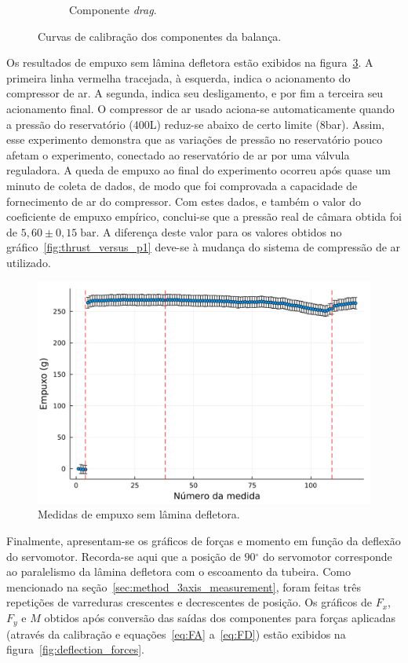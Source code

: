 \begin{figure}[htbp]
\begin{subfigure}{\textwidth}
        \caption{Componente \textit{drag}.}\label{fig:calibration_FD}
    \end{subfigure}
    \caption{Curvas de calibração dos componentes da balança.}\label{fig:calibration_curves}
\end{figure}

Os resultados de empuxo sem lâmina defletora estão exibidos na figura~\ref{fig:thrust_no_deflector}. A primeira linha vermelha tracejada, à esquerda, indica o acionamento do compressor de ar. A segunda, indica seu desligamento, e por fim a terceira seu acionamento final. O compressor de ar usado aciona-se automaticamente quando a pressão do reservatório (400L) reduz-se abaixo de certo limite (8bar). Assim, esse experimento demonstra que as variações de pressão no reservatório pouco afetam o experimento, conectado ao reservatório de ar por uma válvula reguladora. A queda de empuxo ao final do experimento ocorreu após quase um minuto de coleta de dados, de modo que foi comprovada a capacidade de fornecimento de ar do compressor. Com estes dados, e também o valor do coeficiente de empuxo empírico, conclui-se que a pressão real de câmara obtida foi de \(5,60\pm 0,15\;\mathrm{bar}\). A diferença deste valor para os valores obtidos no gráfico~\ref{fig:thrust_versus_p1} deve-se à mudança do sistema de compressão de ar utilizado.

\begin{figure}[htbp]
    \centering
    \includegraphics[width=\textwidth]{img/results/thrust_no_deflector.png}
    \caption{Medidas de empuxo sem lâmina defletora.}\label{fig:thrust_no_deflector}
\end{figure}

Finalmente, apresentam-se os gráficos de forças e momento em função da deflexão do servomotor. Recorda-se aqui que a posição de \(90\mathrm{^{\circ}}\) do servomotor corresponde ao paralelismo da lâmina defletora com o escoamento da tubeira. Como mencionado na seção~\ref{sec:method_3axis_measurement}, foram feitas três repetições de varreduras crescentes e decrescentes de posição. Os gráficos de \(F_x\), \(F_y\) e \(M\) obtidos após conversão das saídas dos componentes para forças aplicadas (através da calibração e equações~\ref{eq:FA} a~\ref{eq:FD}) estão exibidos na figura~\ref{fig:deflection_forces}.

